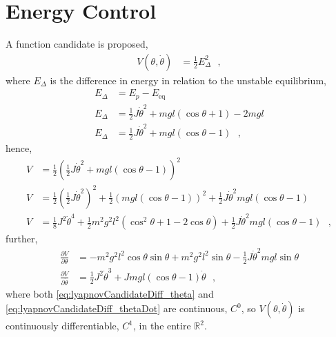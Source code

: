 \section{Energy Control}
A function candidate is proposed,
\begin{align}
  V(\theta, \dot{\theta}) &= \tfrac{1}{2} E_\Delta ^2 \ \ \ ,   \label{eq:lyapunovCandidate} 
\end{align}
where $E_\Delta$ is the difference in energy in relation to the unstable equilibrium,
%
\begin{align}
  E_\Delta &= E_p  - E_{\mathrm{eq}}   \label{eq:energyDelta1} \\
  E_\Delta &= \tfrac{1}{2} J \dot{\theta}^2 + m g l (\cos \theta +1) - 2 m g l  \label{eq:energyDelta2} \\
  E_\Delta &= \tfrac{1}{2} J \dot{\theta}^2 + m g l (\cos \theta -1)   \ \ \ ,  \label{eq:energyDelta3}
\end{align}
hence,
\begin{align}
  V &= \tfrac{1}{2}( \tfrac{1}{2} J \dot{\theta}^2 + m g l (\cos \theta -1)  ) ^2 \\ 
  V &= \tfrac{1}{2} (\tfrac{1}{2} J \dot{\theta}^2)^2 + \tfrac{1}{2} (m g l (\cos \theta -1)  ) ^2  +  \tfrac{1}{2} J \dot{\theta}^2  m g l (\cos \theta -1) \\
  V &= \tfrac{1}{8} J^2 \dot{\theta}^4 + \tfrac{1}{2} m^2 g^2 l^2 ( \cos^2 \theta + 1 -2\cos \theta )  +  \tfrac{1}{2} J \dot{\theta}^2  m g l (\cos \theta -1)  \ \ \ , \label{eq:lyapunovCandidate2}
\end{align}
further,
\begin{align}
\frac{\partial V}{\partial \theta}       &= -m^2 g^2 l^2 \cos \theta \sin \theta + m^2 g^2 l^2 \sin \theta - \tfrac{1}{2} J \dot{\theta}^2 m g l \sin \theta \label{eq:lyapnovCandidateDiff_theta} \\
\frac{\partial V}{\partial \dot{\theta}} &=  \tfrac{1}{2} J^2 \dot{\theta}^3 + J m g l ( \cos \theta - 1 ) \dot{\theta} \ \ \ ,  \label{eq:lyapnovCandidateDiff_thetaDot}
\end{align}
where both \autoref{eq:lyapnovCandidateDiff_theta} and \ref{eq:lyapnovCandidateDiff_thetaDot} are continuous, $C^0$, so $V(\theta,\dot{\theta})$ is continuously differentiable, $C^1$, in the entire $\mathbb{R}^2$.

